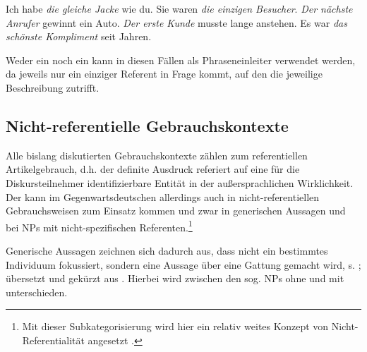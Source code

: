  \begin{exe}
	\ex \label{ex:mod}   
	\begin{xlist}
		\ex \label{ex:same} Ich habe \textit{die gleiche Jacke} wie du.
		\ex \label{ex:only} Sie waren \textit{die einzigen Besucher}.   
		\ex \label{ex:next} \textit{Der nächste Anrufer} gewinnt ein Auto. 
		\ex \label{ex:first} \textit{Der erste Kunde} musste lange anstehen.  
		\ex \label{ex:super} Es war \textit{das schönste Kompliment} seit Jahren.
		\end{xlist}
\end{exe}

Weder ein  noch ein  kann in diesen Fällen als Phraseneinleiter  verwendet werden, da jeweils nur ein einziger Referent in Frage kommt, auf den die jeweilige Beschreibung zutrifft.  

\subsection{Nicht-referentielle Gebrauchskontexte}\label{sec:nicht-referentiell}

Alle bislang diskutierten Gebrauchskontexte zählen zum referentiellen  Artikelgebrauch, d.h. der definite Ausdruck referiert auf eine für die Diskursteilnehmer identifizierbare Entität in der außersprachlichen Wirklichkeit.
Der  kann im Gegenwartsdeutschen allerdings auch in nicht-referentiellen  Gebrauchsweisen zum Einsatz kommen und zwar in generischen  Aussagen und bei NPs  mit nicht-spezifischen   Referenten.\footnote{Mit dieser Subkategorisierung wird hier ein relativ weites Konzept von Nicht-Referentialität  angesetzt \parencite[zur Abgrenzungsdiskussion von ,  und  vgl. u.a.][]{Bisle-Muller1991,Lyons1999,Studler2011,vonHeusinger2011}.} 


Generische Aussagen  zeichnen sich dadurch aus, dass nicht ein bestimmtes Individuum fokussiert, sondern eine Aussage über eine Gattung gemacht wird, s. ; übersetzt und gekürzt aus \textcite[2-3]{Krifka1995}. Hierbei wird zwischen den sog.  NPs  ohne und mit  unterschieden.   

